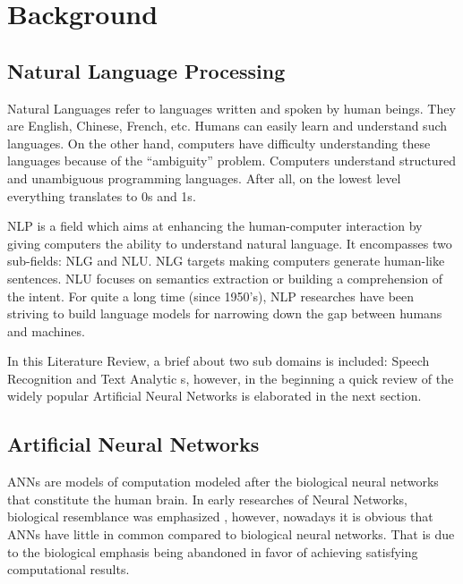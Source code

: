 \chapter{Background}
\label{chap:background}

\section{Natural Language Processing} 
\label{bg:s1}


Natural Languages refer to languages written and spoken by human beings. They are English, Chinese, French, etc. Humans can easily learn and understand such languages. On the other hand, computers have difficulty understanding these languages because of the \enquote{ambiguity} problem. Computers understand structured and unambiguous programming languages. After all, on the lowest level everything translates to 0s and 1s. 

\ac{NLP} is a field which aims at enhancing the human-computer interaction by giving computers the ability to understand natural language. It encompasses two sub-fields: \ac{NLG} and \ac{NLU}. \ac{NLG} targets making computers generate human-like sentences. \ac{NLU} focuses on semantics extraction or building a comprehension of the intent. For quite a long time (since 1950's), \ac{NLP} researches have been striving to build language models for narrowing down the gap between humans and machines.


In this Literature Review, a brief about two sub domains is included: Speech Recognition and Text Analytic s, however, in the beginning a quick review of the widely popular Artificial Neural Networks is elaborated in the next section.



\section{Artificial Neural Networks} \label{bg:s2} 
\ac{ANNs} are models of computation modeled after the biological neural networks that constitute the human brain. 
In early researches of Neural Networks, biological resemblance was emphasized \cite{hopfield1982neural} \cite{jordan1986serial} \cite{elman1990finding}, however, nowadays it is obvious that \ac{ANNs} have little in common compared to biological neural networks. That is due to the biological emphasis being abandoned in favor of achieving satisfying computational results.


